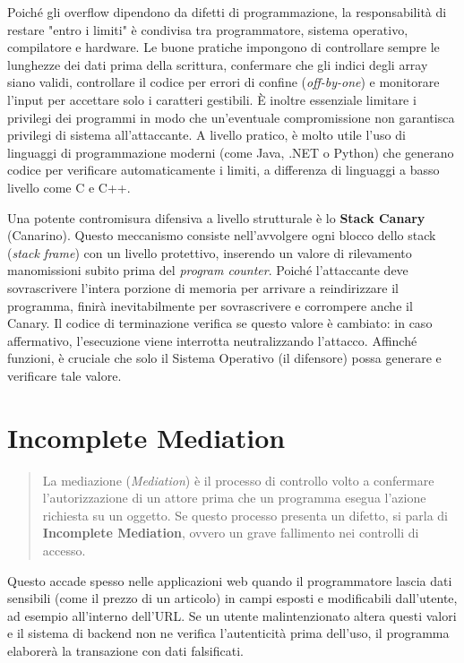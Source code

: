 \documentclass{article}
\begin{document}
Poiché gli overflow dipendono da difetti di programmazione, la responsabilità di restare "entro i limiti" è condivisa tra programmatore, sistema operativo, compilatore e hardware. 
Le buone pratiche impongono di controllare sempre le lunghezze dei dati prima della scrittura, confermare che gli indici degli array siano validi, controllare il codice per errori di confine (\textit{off-by-one}) e monitorare l'input per accettare solo i caratteri gestibili. 
È inoltre essenziale limitare i privilegi dei programmi in modo che un'eventuale compromissione non garantisca privilegi di sistema all'attaccante. 
A livello pratico, è molto utile l'uso di linguaggi di programmazione moderni (come Java, .NET o Python) che generano codice per verificare automaticamente i limiti, a differenza di linguaggi a basso livello come C e C++.

\vspace{0.3cm}
\noindent Una potente contromisura difensiva a livello strutturale è lo \textbf{Stack Canary} (Canarino). 
Questo meccanismo consiste nell'avvolgere ogni blocco dello stack (\textit{stack frame}) con un livello protettivo, inserendo un valore di rilevamento manomissioni subito prima del \textit{program counter}. 
Poiché l'attaccante deve sovrascrivere l'intera porzione di memoria per arrivare a reindirizzare il programma, finirà inevitabilmente per sovrascrivere e corrompere anche il Canary. 
Il codice di terminazione verifica se questo valore è cambiato: in caso affermativo, l'esecuzione viene interrotta neutralizzando l'attacco. 
Affinché funzioni, è cruciale che solo il Sistema Operativo (il difensore) possa generare e verificare tale valore.

\vspace{0.8cm}

\section*{Incomplete Mediation}

\begin{quote}
    La mediazione (\textit{Mediation}) è il processo di controllo volto a confermare l'autorizzazione di un attore prima che un programma esegua l'azione richiesta su un oggetto. Se questo processo presenta un difetto, si parla di \textbf{Incomplete Mediation}, ovvero un grave fallimento nei controlli di accesso.
\end{quote}

\noindent Questo accade spesso nelle applicazioni web quando il programmatore lascia dati sensibili (come il prezzo di un articolo) in campi esposti e modificabili dall'utente, ad esempio all'interno dell'URL. 
Se un utente malintenzionato altera questi valori e il sistema di backend non ne verifica l'autenticità prima dell'uso, il programma elaborerà la transazione con dati falsificati.
\end{document}
